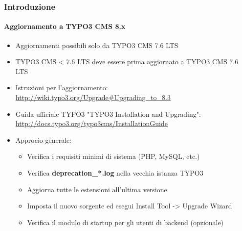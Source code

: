 \begin{frame}[fragile]
	\frametitle{Introduzione}
	\framesubtitle{Aggiornamento a TYPO3 CMS 8.x}

	\begin{itemize}
		\item Aggiornamenti possibili solo da TYPO3 CMS 7.6 LTS
		\item TYPO3 CMS < 7.6 LTS deve essere prima aggiornato a TYPO3 CMS 7.6 LTS
	\end{itemize}

	\begin{itemize}

		\item Istruzioni per l'aggiornamento:\newline
			\smaller\url{http://wiki.typo3.org/Upgrade#Upgrading_to_8.3}\normalsize
		\item Guida ufficiale TYPO3 "TYPO3 Installation and Upgrading":
			\smaller\url{http://docs.typo3.org/typo3cms/InstallationGuide}\normalsize
		\item Approcio generale:
			\begin{itemize}
				\item Verifica i requisiti minimi di sistema \small(PHP, MySQL, etc.)
				\item Verifica \textbf{deprecation\_*.log} nella vecchia istanza TYPO3
				\item Aggiorna tutte le estensioni all'ultima versione
				\item Imposta il nuovo sorgente ed esegui Install Tool -> Upgrade Wizard
				\item Verifica il modulo di startup per gli utenti di backend (opzionale)
			\end{itemize}
	\end{itemize}

\end{frame}



